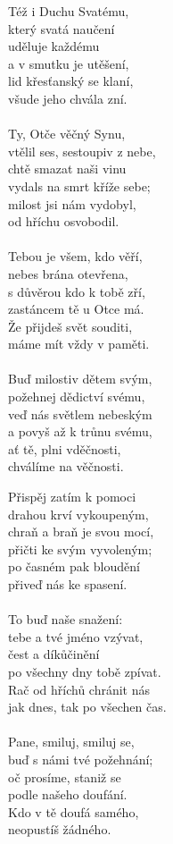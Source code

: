 \begin{translatioMulticol}{3}
Též i Duchu Svatému,\\
který svatá naučení\\
uděluje každému\\
a v smutku je utěšení,\\
lid křesťanský se klaní,\\
všude jeho chvála zní.\\
\\
Ty, Otče věčný Synu,\\
vtělil ses, sestoupiv z nebe,\\
chtě smazat naši vinu\\
vydals na smrt kříže sebe;\\
milost jsi nám vydobyl,\\
od hříchu osvobodil.\\
\\
Tebou je všem, kdo věří,\\
nebes brána otevřena,\\
s důvěrou kdo k tobě zří,\\
zastáncem tě u Otce má.\\
Že přijdeš svět souditi,\\
máme mít vždy v paměti.\\
\\
Buď milostiv dětem svým,\\
požehnej dědictví svému,\\
veď nás světlem nebeským\\
a povyš až k trůnu svému,\\
ať tě, plni vděčnosti,\\
chválíme na věčnosti.\columnbreak

Přispěj zatím k pomoci\\
drahou krví vykoupeným,\\
chraň a braň je svou mocí,\\
přičti ke svým vyvoleným;\\
po časném pak bloudění\\
přiveď nás ke spasení.\\
\\
To buď naše snažení:\\
tebe a tvé jméno vzývat,\\
čest a díkůčinění\\
po všechny dny tobě zpívat.\\
Rač od hříchů chránit nás\\
jak dnes, tak po všechen čas.\\
\\
Pane, smiluj, smiluj se,\\
buď s námi tvé požehnání;\\
oč prosíme, staniž se\\
podle našeho doufání.\\
Kdo v tě doufá samého,\\
neopustíš žádného.
\end{translatioMulticol}
